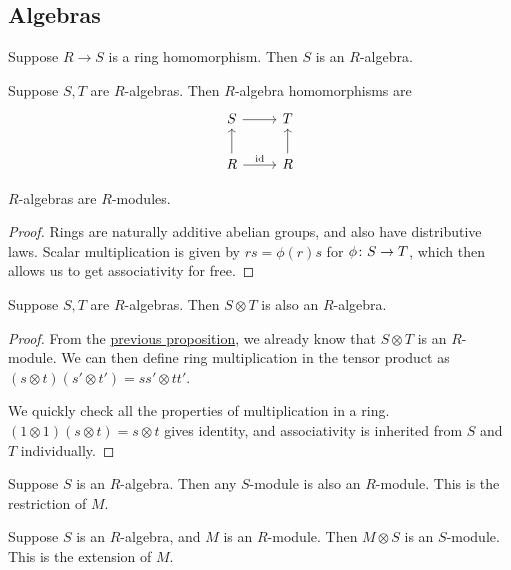 \subsection*{Algebras}

\begin{definition}
    Suppose \(R \to S\) is a ring homomorphism.
    Then \(S\) is an \(R\)-algebra.
\end{definition}
\begin{definition}
    Suppose \(S,T\) are \(R\)-algebras.
    Then \(R\)-algebra homomorphisms are
    \begin{equation*}
        \begin{tikzcd}
            S \arrow{r} & T \\
            R \arrow{u} \arrow{r}{\id} & R \arrow{u}
        \end{tikzcd}
    \end{equation*}
\end{definition}
\begin{proposition}\label{prop:algebras-are-modules}
    \(R\)-algebras are \(R\)-modules.
\end{proposition}
\begin{proof}
    Rings are naturally additive abelian groups,
    and also have distributive laws.
    Scalar multiplication is given by \(rs = \phi(r)s\) for \(\phi\colon S\to T\),
    which then allows us to get associativity for free.
\end{proof}

\begin{proposition}
    Suppose \(S,T\) are \(R\)-algebras.
    Then \(S \otimes T\) is also an \(R\)-algebra.
\end{proposition}
\begin{proof}
    From the \hyperref[prop:algebras-are-modules]{previous proposition},
    we already know that \(S \otimes T\) is an \(R\)-module.
    We can then define ring multiplication in the tensor product as
    \((s \otimes t)(s' \otimes t') = ss' \otimes tt'\).

    We quickly check all the properties of multiplication in a ring.
    \((1 \otimes 1)(s \otimes t) = s \otimes t\) gives identity,
    and associativity is inherited from \(S\) and \(T\) individually.
\end{proof}

\begin{definition}
    Suppose \(S\) is an \(R\)-algebra.
    Then any \(S\)-module is also an \(R\)-module.
    This is the restriction of \(M\).
\end{definition}
\begin{definition}
    Suppose \(S\) is an \(R\)-algebra, and \(M\) is an \(R\)-module.
    Then \(M \otimes S\) is an \(S\)-module.
    This is the extension of \(M\).
\end{definition}



